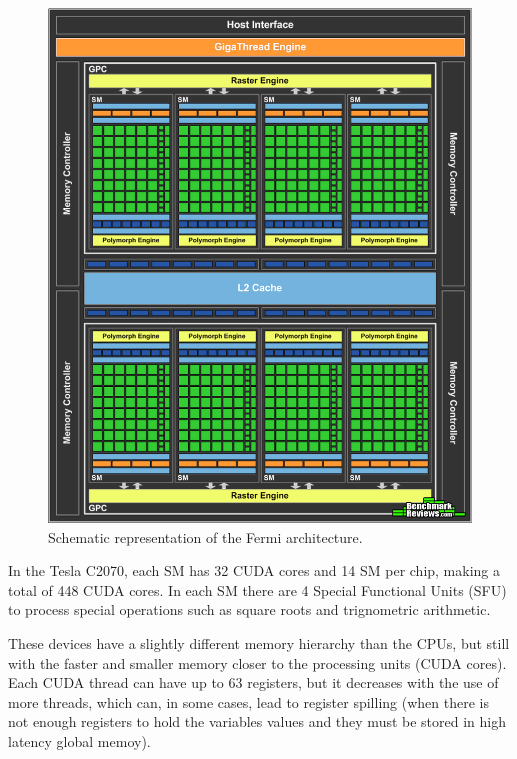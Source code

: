 \begin{figure}[!htp]
	\begin{center}
		\includegraphics[scale=0.25]{../../common/img/fermi_arch.png}
		\caption{Schematic representation of the \nvidia Fermi architecture.}
		\label{fig:FermiArchitecture}
	\end{center}
\end{figure}

In the Tesla C2070, each SM has 32 CUDA cores and 14 SM per chip, making a total of 448 CUDA cores. In each SM there are 4 Special Functional Units (SFU) to process special operations such as square roots and trignometric arithmetic.

These devices have a slightly different memory hierarchy than the CPUs, but still with the faster and smaller memory closer to the processing units (CUDA cores). Each CUDA thread can have up to 63 registers, but it decreases with the use of more threads, which can, in some cases, lead to register spilling (when there is not enough registers to hold the variables values and they must be stored in high latency global memoy).


